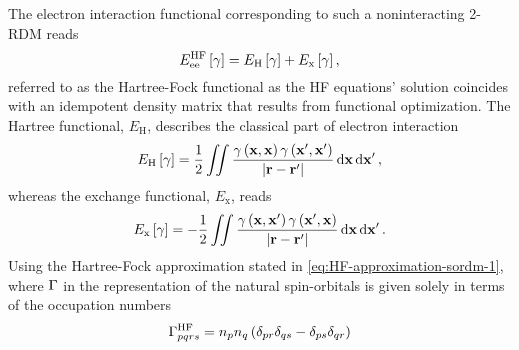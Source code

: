 \begin{enumerate}
        The electron interaction functional corresponding to such a
        noninteracting 2-RDM reads 
        \begin{equation} \label{eq:Eee-HF}
            E_{\text{ee}}^{\text{HF}} \left[ \gamma \right] =
            E_{\text{H}} \left[ \gamma \right] + E_{\text{x}} \left[ \gamma \right]
            ,
        \end{equation}
        referred to as the Hartree-Fock functional as the HF equations' 
        solution coincides with an idempotent density matrix that results 
        from functional optimization.
        The Hartree functional, $E_{\text{H}}$, describes the classical
        part of electron interaction 
        \begin{equation} \label{eq:Eee-H}
            E_{\text{H}} \left[ \gamma \right] = \frac{1}{2} \iint
            \frac{
                \gamma \left( \boldsymbol{\mathrm{x}}, \boldsymbol{\mathrm{x}} \right)
                \gamma \left( \boldsymbol{\mathrm{x}}^{\prime}, \boldsymbol{\mathrm{x}}^{\prime} \right)
            }{\left| \boldsymbol{\mathrm{r}} - \boldsymbol{\mathrm{r}}^{\prime} \right|}
            \dd{ \boldsymbol{\mathrm{x}}} \dd{ \boldsymbol{\mathrm{x}}^{\prime}}
            ,
        \end{equation}
        whereas the exchange functional, $E_{\text{x}}$, reads 
        \begin{equation} \label{eq:Eee-x}
            E_{\text{x}} \left[ \gamma \right] = -\frac{1}{2} \iint
            \frac{
                \gamma \left( \boldsymbol{\mathrm{x}}, \boldsymbol{\mathrm{x}}^{\prime} \right)
                \gamma \left( \boldsymbol{\mathrm{x}}^{\prime}, \boldsymbol{\mathrm{x}} \right)
            }{\left| \boldsymbol{\mathrm{r}} - \boldsymbol{\mathrm{r}}^{\prime} \right|}
            \dd{ \boldsymbol{\mathrm{x}}} \dd{ \boldsymbol{\mathrm{x}}^{\prime}}
            .
        \end{equation}
        Using the Hartree-Fock approximation stated in \cref{eq:HF-approximation-sordm-1},
        where $\Gamma$ in the representation of the natural spin-orbitals is given 
        solely in terms of the occupation numbers
        \begin{equation}
            \sordm_{pqrs}^{\text{HF}}
            =
            n_p n_q \left( \delta_{pr} \delta_{qs} - \delta_{ps} \delta_{qr} \right)

\end{equation}
\end{enumerate}
